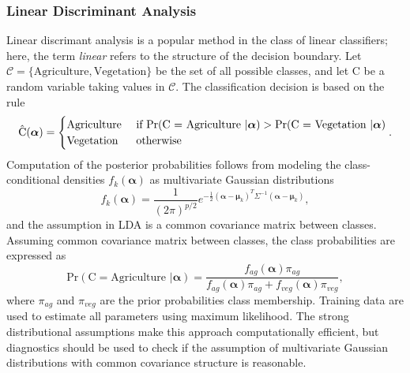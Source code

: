 \subsubsection{Linear Discriminant Analysis} %
\label{sub:LDA}
Linear discrimant analysis is a popular method in the class of linear classifiers; here, the term \emph{linear} refers to the structure of the decision boundary. Let $\mathcal{C} = \{ \text{Agriculture}, \text{Vegetation}\}$ be the set of all possible classes, and let C be a random variable taking values in $\mathcal{C}$. The classification decision is based on the rule
\begin{equation}
	\hat{\text{C}}(\boldsymbol{\alpha}) = 
	\begin{cases}
			\text{Agriculture} \hfill & \text{ if } \text{Pr}(\text{C = Agriculture }| \boldsymbol{\alpha})> \text{Pr}(\text{C = Vegetation }| \boldsymbol{\alpha})\\
			\text{Vegetation} \hfill & \text{ otherwise}
	\end{cases}.
\end{equation}  
Computation of the posterior probabilities follows from modeling the class-conditional densities $f_k(\boldsymbol\alpha)$ as multivariate Gaussian distributions
\begin{equation}
	f_k(\boldsymbol\alpha) = \frac{1}{(2\pi)^{p/2}}e^{-\frac{1}{2}(\boldsymbol\alpha - \boldsymbol\mu_k)^T\Sigma^{-1}(\boldsymbol\alpha - \boldsymbol\mu_k)},
\end{equation}
and the assumption in LDA is a common covariance matrix between classes. Assuming common covariance matrix between classes, the class probabilities are expressed as
\begin{equation}
	\text{Pr}(\text{C} = \text{Agriculture } | \boldsymbol\alpha) = \frac{f_{ag}(\boldsymbol\alpha)\pi_{ag}}{f_{ag}(\boldsymbol\alpha)\pi_{ag}+f_{veg}(\boldsymbol\alpha)\pi_{veg}},
\end{equation}
where $\pi_{ag}$ and $\pi_{veg}$ are the prior probabilities class membership. Training data are used to estimate all parameters using maximum likelihood. The strong distributional assumptions make this approach computationally efficient, but diagnostics should be used to check if the assumption of multivariate Gaussian distributions with common covariance structure is reasonable. 

